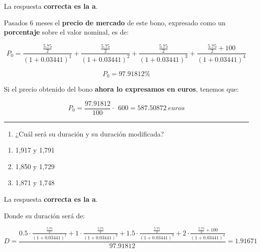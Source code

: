 \documentclass[
  letterpaper,
  DIV=11,
  numbers=noendperiod]{scrreprt}
\providecommand{\tightlist}{%
  \setlength{\itemsep}{0pt}\setlength{\parskip}{0pt}}\usepackage{longtable,booktabs,array}
\begin{document}
\begin{tcolorbox}
\begin{tcolorbox}
La respuesta \textbf{correcta es la a}.

Pasados 6 meses el \textbf{precio de mercado} de este bono, expresado
como un \textbf{porcentaje} sobre el valor nominal, es de:

\[P_0=\frac{\frac{5.75}{2}}{\left(1+0.03441\right)^1}+\frac{\frac{5.75}{2}}{\left(1+0.03441\right)^2}+\frac{\frac{5.75}{2}}{\left(1+0.03441\right)^3}+\frac{\frac{5.75}{2}+100}{\left(1+0.03441\right)^4}\]

\[P_0=97.91812\% \]

Si el precio obtenido del bono \textbf{ahora lo expresamos en euros},
tenemos que:

\[P_0=\frac{97.91812}{100}\cdot \:\:600=587.50872\ euros\]

\end{tcolorbox}

\begin{center}\rule{0.5\linewidth}{0.5pt}\end{center}

\begin{enumerate}
\def\labelenumi{\arabic{enumi}.}
\setcounter{enumi}{1}
\tightlist
\item
  ¿Cuál será su duración y su duración modificada?
\end{enumerate}

\begin{enumerate}
\def\labelenumi{\alph{enumi}.}
\item
  1,917 y 1,791
\item
  1,850 y 1,729
\item
  1,871 y 1,748
\end{enumerate}

\begin{tcolorbox}[enhanced jigsaw, toprule=.15mm, left=2mm, breakable, opacitybacktitle=0.6, toptitle=1mm, coltitle=black, arc=.35mm, leftrule=.75mm, bottomtitle=1mm, titlerule=0mm, title=\textcolor{quarto-callout-tip-color}{\faLightbulb}\hspace{0.5em}{Solución}, rightrule=.15mm, opacityback=0, bottomrule=.15mm, colback=white, colframe=quarto-callout-tip-color-frame, colbacktitle=quarto-callout-tip-color!10!white]

La respuesta \textbf{correcta es la a}.

Donde su duración será de:

\[D=\frac{0.5\cdot \frac{\frac{5.75}{2}}{\left(1+0.03441\right)^1}+1\cdot \frac{\frac{5.75}{2}}{\left(1+0.03441\right)^2}+1.5\cdot \frac{\frac{5.75}{2}}{\left(1+0.03441\right)^3}+2\cdot \frac{\frac{5.75}{2}+100}{\left(1+0.03441\right)^4}}{97.91812}=1.91671\]


\end{tcolorbox}
\end{tcolorbox}
\end{document}
